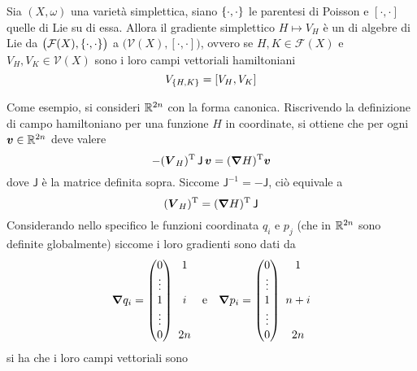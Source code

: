 \begin{theorem}
  Sia $(X, \omega)$ una varietà simplettica, siano $\pb{\cdot}{\cdot}$ le parentesi di Poisson e $[\cdot , \cdot ]$ quelle di Lie su di essa. Allora il gradiente simplettico $H \mapsto V_H$ è un  di algebre di Lie da $\big(\mathcal{F}(X), \pb{\cdot}{\cdot} \big)$ a $\big(\mathcal{V}(X), [\cdot , \cdot]\big)$, ovvero se $H,K \in \mathcal{F}(X)$ e $V_H, V_K \in \mathcal{V}(X)$ sono i loro campi vettoriali hamiltoniani \begin{equation*}
  V_{\pb{H}{K}} = [V_H, V_K]
  \end{equation*} 
\end{theorem}

Come esempio, si consideri $\mathbb{R}^{2n}$ con la forma canonica. Riscrivendo la definizione di campo hamiltoniano per una funzione $H$ in coordinate, si ottiene che per ogni $\boldsymbol{v} \in \mathbb{R}^{2n}$ deve valere
\begin{equation*}
-(\boldsymbol{V}_H)^{\mathrm{T}}\, \mathsf{J}\, \boldsymbol{v} = (\grad{H})^{\mathrm{T}} \boldsymbol{v}
\end{equation*}
dove $\mathsf{J}$ è la matrice definita sopra. Siccome $\mathsf{J}^{-1} = -\mathsf{J}$, ciò equivale a 
\begin{equation*}
(\boldsymbol{V}_H)^{\mathrm{T}} = (\grad{H})^{\mathrm{T}}\, \mathsf{J}
\end{equation*} 
Considerando nello specifico le funzioni coordinata $q_i$ e $p_j$ (che in $\mathbb{R}^{2n}$ sono definite globalmente) siccome i loro gradienti sono dati da
\begin{equation*}
\grad{q_i} = \pmqty{0 \\ \vdots \\ 1 \\ \vdots \\ 0}\ \mqty{1 \\ \phantom{\vdots} \\ i \\ \phantom{\vdots} \\ 2n} \qqtext{e} 
\grad{p_i} = \pmqty{0 \\ \vdots \\ 1 \\ \vdots \\ 0}\ \mqty{1 \\ \phantom{\vdots} \\ n+i \\ \phantom{\vdots} \\ 2n}
\end{equation*} 
si ha che i loro campi vettoriali sono 
